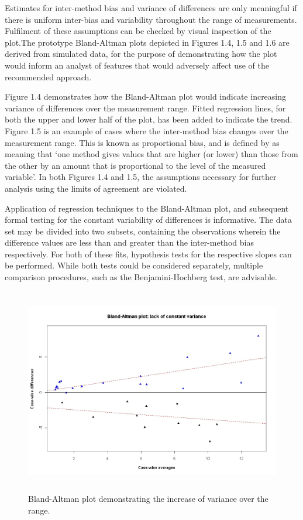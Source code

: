 \documentclass[12pt, a4paper]{report}
\theoremstyle{plain}
\theoremstyle{definition}
\theoremstyle{remark}
\begin{document}
	Estimates for inter-method bias and variance of differences are only meaningful if there is uniform inter-bias and variability throughout the range of measurements. Fulfilment of these assumptions can be checked by visual inspection of the plot.The prototype Bland-Altman plots depicted in Figures 1.4, 1.5 and 1.6 are derived from simulated data, for the purpose of demonstrating how the plot would inform an analyst of features that would adversely affect use of the recommended approach.
	
	Figure 1.4 demonstrates how the Bland-Altman plot would indicate
	increasing variance of differences over the measurement range.
	Fitted regression lines, for both the upper and lower half of the
	plot, has been added to indicate the trend. Figure 1.5 is an example of cases where the inter-method bias changes over the
	measurement range. This is known as proportional bias, and is defined by \citet{ludbrook97} as meaning that `one method gives
	values that are higher (or lower) than those from the other by an
	amount that is proportional to the level of the measured variable'. In both Figures 1.4 and 1.5, the assumptions necessary
	for further analysis using the limits of agreement are violated.
	
	Application of regression techniques to the Bland-Altman plot, and
	subsequent formal testing for the constant variability of
	differences is informative. The data set may be divided into two
	subsets, containing the observations wherein the difference values
	are less than and greater than the inter-method bias respectively.
	For both of these fits, hypothesis tests for the respective slopes
	can be performed. While both tests could be considered separately,
	multiple comparison procedures, such as the Benjamini-Hochberg
	\citep{BH} test, are advisable.
	
	\begin{figure}[h!]
		\begin{center}
			\includegraphics[height=90mm]{images/BAFanEffect.jpeg}
			\caption{Bland-Altman plot demonstrating the increase of variance over the range.}\label{BAFanEffect}
		\end{center}
	\end{figure}
	
\end{document}
